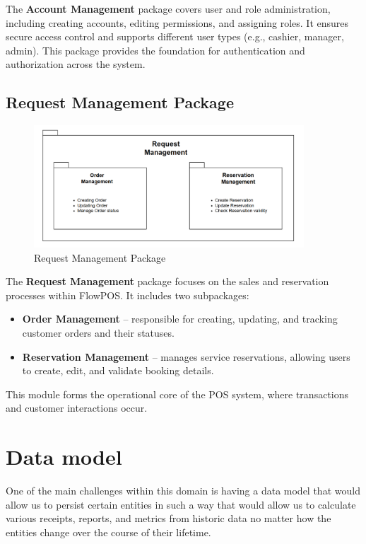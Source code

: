 \documentclass[11pt,a4paper,pdftex]{article}
\begin{document}
The \textbf{Account Management} package covers user and role administration, including creating accounts, editing permissions, and assigning roles. 
It ensures secure access control and supports different user types (e.g., cashier, manager, admin). 
This package provides the foundation for authentication and authorization across the system.

\subsection{Request Management Package}

\begin{figure}[H]
    \centering
    \includegraphics[width=0.9\textwidth]{graphics/Package11.png}
    \caption{Request Management Package}
    \label{fig:package4}
\end{figure}

The \textbf{Request Management} package focuses on the sales and reservation processes within FlowPOS. 
It includes two subpackages:
\begin{itemize}
    \item \textbf{Order Management} – responsible for creating, updating, and tracking customer orders and their statuses.
    \item \textbf{Reservation Management} – manages service reservations, allowing users to create, edit, and validate booking details.
\end{itemize}
This module forms the operational core of the POS system, where transactions and customer interactions occur.
%    
\section{Data model}
One of the main challenges within this domain is having a data model that would allow us to persist certain entities in such a way that would allow us to calculate various receipts, reports, and metrics from historic data no matter how the entities change over the course of their lifetime.
\end{document}

